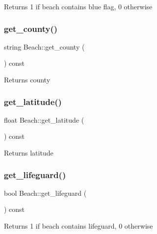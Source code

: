 \begin{DoxyReturn}{Returns}
1 if beach contains blue flag, 0 otherwise 
\end{DoxyReturn}
\mbox{\label{class_beach_ac25e8defc3ad46b44c64a908994bf43c}} 
\subsubsection{\texorpdfstring{get\+\_\+county()}{get\_county()}}
{\footnotesize\ttfamily string Beach\+::get\+\_\+county (\begin{DoxyParamCaption}{ }\end{DoxyParamCaption}) const}

\begin{DoxyReturn}{Returns}
county 
\end{DoxyReturn}
\mbox{\label{class_beach_ae31a69a1f54505904331261db15ab3b6}} 
\subsubsection{\texorpdfstring{get\+\_\+latitude()}{get\_latitude()}}
{\footnotesize\ttfamily float Beach\+::get\+\_\+latitude (\begin{DoxyParamCaption}{ }\end{DoxyParamCaption}) const}

\begin{DoxyReturn}{Returns}
latitude 
\end{DoxyReturn}
\mbox{\label{class_beach_a34d51732d2248a9000a8e7b09e377c5b}} 
\subsubsection{\texorpdfstring{get\+\_\+lifeguard()}{get\_lifeguard()}}
{\footnotesize\ttfamily bool Beach\+::get\+\_\+lifeguard (\begin{DoxyParamCaption}{ }\end{DoxyParamCaption}) const}

\begin{DoxyReturn}{Returns}
1 if beach contains lifeguard, 0 otherwise 
\end{DoxyReturn}
\mbox{\label{class_beach_a129633666198d102f58fe1dc7b9f89d8}} 
